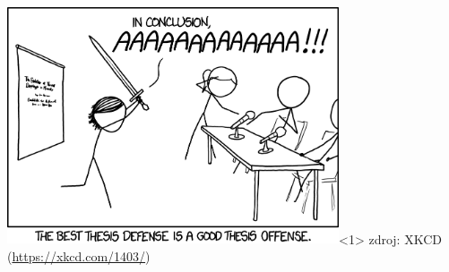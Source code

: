 \documentclass[slovak,10pt]{beamer}
\begin{document}
\begin{frame}
	\frametitle{}

	\includegraphics[height=7cm]{images/thesis_defense_2x.png}<1>
	zdroj: XKCD (\url{https://xkcd.com/1403/})
\end{frame}
\end{document}
